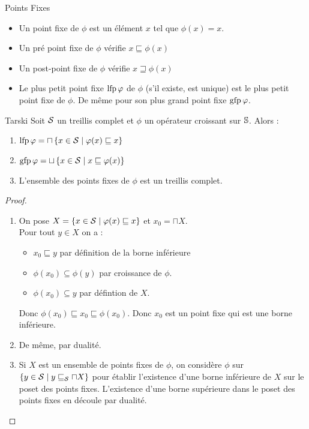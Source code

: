 \documentclass{cours}
\begin{document}
\begin{définition}{Points Fixes}{}
    \begin{itemize}
        \item Un point fixe de $\phi$ est un élément $x$ tel que $\phi(x) = x$.
        \item Un pré point fixe de $\phi$ vérifie $x \sqsubseteq \phi(x)$
        \item Un post-point fixe de $\phi$ vérifie $x \sqsupseteq \phi(x)$
        \item Le plus petit point fixe $\lfp\phi$ de $\phi$ (s'il existe, est unique) est le plus petit point fixe de $\phi$. De même pour son plus grand point fixe $\gfp\phi$.
    \end{itemize}
\end{définition}

\begin{théorème}{Tarski}{}
    Soit $\mS$ un treillis complet et $\phi$ un opérateur croissant sur $\S$. Alors : 
    \begin{enumerate}
        \item $\lfp\phi = \sqcap\left\{x \in \mS \mid \phi(x) \sqsubseteq x\right\}$
        \item $\gfp\phi = \sqcup\left\{x \in \mS \mid x \sqsubseteq \phi(x)\right\}$
        \item L'ensemble des points fixes de $\phi$ est un treillis complet.
    \end{enumerate}
\end{théorème}
\begin{proof}
    \begin{enumerate}
        \item On pose $X = \{x \in \mS \mid \phi(x) \sqsubseteq x\}$ et $x_{0} = \sqcap X$.\\
        Pour tout $y \in X$ on a : 
        \begin{itemize}
            \item $x_{0} \sqsubseteq y$ par définition de la borne inférieure
            \item $\phi(x_{0}) \subseteq \phi(y)$ par croissance de $\phi$.
            \item $\phi(x_{0}) \subseteq y$ par défintion de $X$.
        \end{itemize}
        Donc $\phi(x_{0}) \sqsubseteq x_{0} \sqsubseteq \phi(x_{0})$. Donc $x_{0}$ est un point fixe qui est une borne inférieure.
        \item De même, par dualité.
        \item Si $X$ est un ensemble de points fixes de $\phi$, on considère $\phi$ sur $\left\{y \in \mS \mid y \sqsubseteq_{\mS} \sqcap X\right\}$ pour établir l'existence d'une borne inférieure de $X$ sur le poset des points fixes. L'existence d'une borne supérieure dans le poset des points fixes en découle par dualité.
    \end{enumerate}
\end{proof}
\end{document}
